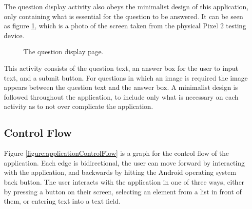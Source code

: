 \documentclass{article}
\begin{document}
The question display activity also obeys the minimalist design of this application, only containing what is essential for the question to be answered. It can be seen as figure \ref{figure:applicationQuestionPage}, which is a photo of the screen taken from the physical Pixel 2 testing device.

\begin{figure}[H]
	\centering
	\caption{The question display page.}
	\label{figure:applicationQuestionPage}
\end{figure}

This activity consists of the question text, an answer box for the user to input text, and a submit button. For questions in which an image is required the image appears between the question text and the answer box. A minimalist design is followed throughout the application, to include only what is necessary on each activity as to not over complicate the application. \par

\subsection{Control Flow}

Figure \ref{figure:applicationControlFlow} is a graph for the control flow of the application. Each edge is bidirectional, the user can move forward by interacting with the application, and backwards by hitting the Android operating system back button. The user interacts with the application in one of three ways, either by pressing a button on their screen, selecting an element from a list in front of them, or entering text into a text field. \par
\end{document}
